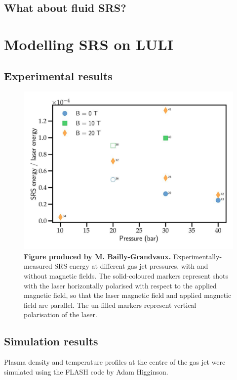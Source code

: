 \subsection{What about fluid SRS?}

\section{Modelling SRS on LULI}
\subsection{Experimental results}
\begin{figure}[ht]
   \centering
    \includegraphics[width=0.8\columnwidth]{Chapters/C6_magSRS/SRS_LULI.png}
    \caption{\textbf{Figure produced by M. Bailly-Grandvaux.} Experimentally-measured SRS energy at different gas jet pressures, with and without magnetic fields. The solid-coloured markers represent shots with the laser  horizontally polarised with respect to the applied magnetic field, so that the laser magnetic field and applied magnetic field are parallel. The un-filled markers represent vertical polarisation of the laser.}
    \label{fig:SRS_LULI}
\end{figure}{}


\subsection{Simulation results}

Plasma density and temperature profiles at the centre of the gas jet were simulated using the FLASH code by Adam Higginson. 

